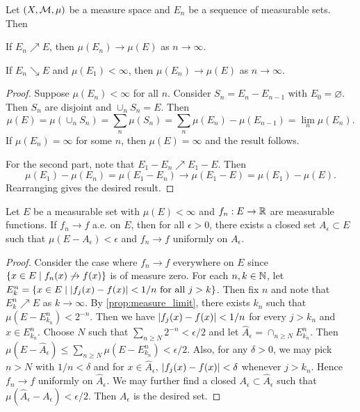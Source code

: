 \begin{proposition}\label{prop:measure_limit}
    Let $(X,\mathcal{M},\mu)$ be a measure space and $E_n$ be a sequence of 
    measurable sets. Then 
    \begin{thmenum}
        \item If $E_n\nearrow E$, then $\mu(E_n)\to\mu(E)$ as $n\to\infty$. 
        \item If $E_n\searrow E$ and $\mu(E_1)<\infty$, then $\mu(E_n)\to\mu(E)$ as $n\to\infty$.
    \end{thmenum}
\end{proposition}
\begin{proof}
    Suppose $\mu(E_n)<\infty$ for all $n$. Consider $S_n = E_n - E_{n-1}$ with 
    $E_0 = \varnothing$. Then $S_n$ are disjoint and $\cup_n S_n = E$. Then 
    \begin{equation*}
        \mu(E) = \mu(\cup_n S_n) = \sum_n \mu(S_n) = \sum_n \mu(E_n) - \mu(E_{n-1}) = \lim_n \mu(E_n).
    \end{equation*}
    If $\mu(E_n) = \infty$ for some $n$, then $\mu(E) = \infty$ and the result 
    follows.

    For the second part, note that $E_1-E_n\nearrow E_1-E$. Then 
    \begin{equation*}
        \mu(E_1) - \mu(E_n) = \mu(E_1-E_n) \to \mu(E_1-E) = \mu(E_1) - \mu(E).
    \end{equation*}
    Rearranging gives the desired result.
\end{proof}

\begin{theorem}[Egorov]
    Let $E$ be a measurable set with $\mu(E)<\infty$ and $f_n:E\to\mathbb{R}$ are 
    measurable functions. If $f_n\to f$ a.e. on $E$, then for all 
    $\epsilon>0$, there exists a closed set $A_\epsilon\subset E$ such 
    that $\mu(E-A_\epsilon)<\epsilon$ and $f_n\to f$ uniformly on $A_\epsilon$.
\end{theorem}
\begin{proof}
    Consider the case where $f_n\to f$ everywhere on $E$ since 
    $\left\{ x\in E \;\middle\vert\; f_n(x)\not\to f(x) \right\}$ is of measure zero. For each 
    $n,k\in\mathbb{N}$, let $E_k^n = \left\{ x\in E \;\middle\vert\; \left\lvert {f_j(x)-f(x)} \right\rvert<1/n \text{ for all }j>k \right\}$. 
    Then fix $n$ and note that $E_k^n\nearrow E$ as $k\to\infty$. By 
    \cref{prop:measure_limit}, there exists $k_n$ such that $\mu(E-E_{k_n}^n)<2^{-n}$. 
    Then we have $\left\lvert {f_j(x)-f(x)} \right\rvert<1/n$ for every $j>k_n$ and $x\in E_{k_n}^n$. 
    Choose $N$ such that $\sum_{n\geq N}2^{-n}<\epsilon/2$ and let 
    $\hat{A}_\epsilon = \cap_{n\geq N} E^n_{k_n}$. Then 
    $\mu(E-\hat{A}_\epsilon)\leq \sum_{n\geq N}\mu(E-E^n_{k_n})<\epsilon/2$. 
    Also, for any $\delta>0$, we may pick $n>N$ with $1/n<\delta$ and 
    for $x\in\hat{A}_\epsilon$, $\left\lvert {f_j(x)-f(x)} \right\rvert<\delta$ whenever $j>k_n$. 
    Hence $f_n\to f$ uniformly on $\hat{A}_\epsilon$. We may further 
    find a closed $A_\epsilon\subset\hat{A}_\epsilon$ such that 
    $\mu(\hat{A}_\epsilon-A_\epsilon)<\epsilon/2$. Then $A_\epsilon$ 
    is the desired set.
\end{proof}

